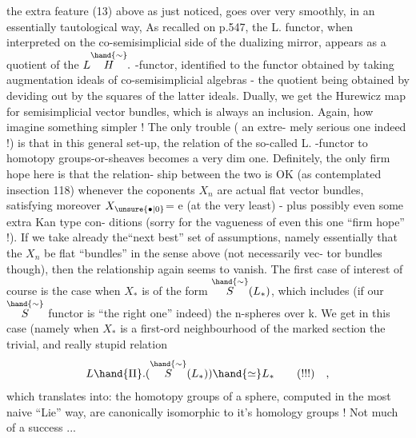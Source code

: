 
the extra feature (13) above as just noticed,\hand{)} goes over very smoothly,
in an essentially tautological way, As recalled on p.547, the L\hand{$\Pi$}.
functor, when interpreted on the co-semisimplicial side
of the dualizing mirror, appears as a quotient of the $L\overset{\hand{\sim}}{H}.$ -functor,
identified to the functor obtained by taking augmentation ideals of
co-semisimplicial algebras - the quotient being obtained by deviding
out by the squares of the latter ideals. Dually, we get the Hurewicz
map for semisimplicial vector bundles, which is always an inclusion.
Again, how imagine something simpler ! The only trouble ( an extre-%
mely serious one indeed !) is that in this general set-up, the relation
of the so-called L\hand{$\Pi$}. -functor to homotopy groups-or-sheaves becomes a
very dim one. Definitely, the only firm hope here is that the relation-%
ship between the two is OK (as contemplated in\hand{|}section 118) whenever
the coponents $X_{n}$ are actual flat vector bundles, satisfying moreover
$X_{\unsure{\bullet|0}}$= e (at the very least) - plus possibly even some extra Kan type con-%
ditions (sorry for the vagueness of even this one ``firm hope'' !). If
we take already the``next best'' set of assumptions, namely essentially
that the $X_{n}$ be flat ``bundles'' in the sense above (not necessarily vec-%
tor bundles though), then the  relationship again seems to vanish. The
first case of interest of course is the case when $X_{*}$ is of the form
$\overset{\hand{\sim}}{S}(L_{*})$, which includes (if our $\overset{\hand{\sim}}{S}$ functor is ``the right one'' indeed) the
n-spheres over k. We get in this case (namely when $X_{*}$ is a first-ord
neighbourhood of the marked section\over{,}{)} the trivial, and really stupid
relation
\[ L\hand{\Pi}.(\overset{\hand{\sim}}{S}(L_{*}))\hand{\simeq} L_{*} \qquad (!!!) \quad , \]
\margin{$\lfloor$}which translates into: the homotopy groups of a sphere, computed in
the most naive ``Lie'' way, are canonically isomorphic to it's homology
groups ! Not much of a success ...

